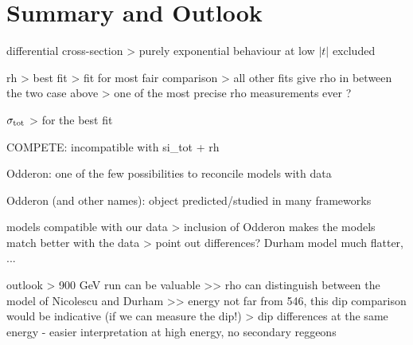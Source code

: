 \section{Summary and Outlook}
\label{sec:summary}

\bgroup
\parskip0pt

\> differential cross-section
\>> purely exponential behaviour at low $|t|$ excluded

\> rh
\>> best fit
\>> fit for most fair comparison
\>> all other fits give rho in between the two case above
\>> one of the most precise rho measurements ever ?

\> $\sigma_{\rm tot}$
\>> for the best fit

\> COMPETE: incompatible with si\_tot + rh

\> Odderon: one of the few possibilities to reconcile models with data

\> Odderon (and other names): object predicted/studied in many frameworks

\> models compatible with our data
\>> inclusion of Odderon makes the models match better with the data
\>> point out differences? Durham model much flatter, ...

\> outlook
\>> 900 GeV run can be valuable
\>>> rho can distinguish between the model of Nicolescu and Durham
\>>> energy not far from 546, this dip comparison would be indicative (if we can measure the dip!)
\>> dip differences at the same energy - easier interpretation at high energy, no secondary reggeons
 
\egroup

